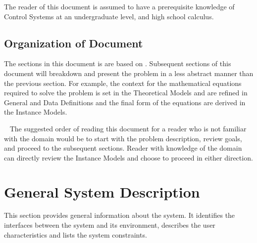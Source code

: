 \documentclass[12pt]{article}
\begin{document}
The reader of this document is assumed to have a prerequisite knowledge of 
Control Systems at an undergraduate level, and high school calculus. 

\subsection{Organization of Document}


The sections in this document is are based on \citet{SmithAndLai2005, 
SmithEtAl2007}. Subsequent sections of this document will breakdown and present 
the problem in a less abstract manner than the previous section. 
For example, the context for the mathematical equations required to solve the 
problem is set in the Theoretical Models and are refined in General and Data 
Definitions and the final form of the equations are derived in the Instance 
Models. 

~\newline
The suggested order of reading this document for a reader who is not familiar 
with the domain would be to start with the problem description, review goals, 
and proceed to the subsequent sections. Reader with knowledge of the domain 
can directly review the Instance Models and choose to proceed in either direction.

\section{General System Description}

This section provides general information about the system. It identifies the
interfaces between the system and its environment, describes the user
characteristics and lists the system constraints.  

\end{document}
